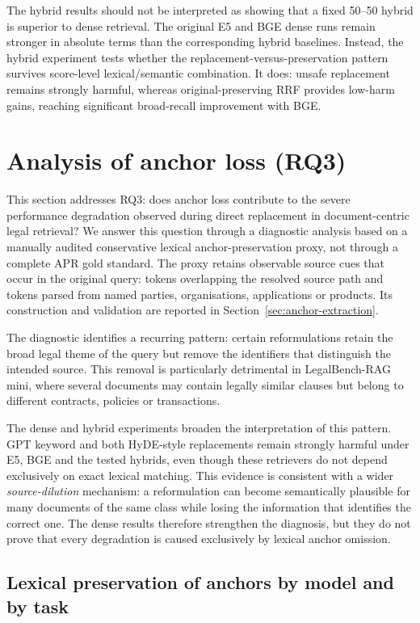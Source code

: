 \documentclass[a4paper,fleqn]{cas-dc}
\begin{document}
The hybrid results should not be interpreted as showing that a
fixed 50--50 hybrid is superior to dense retrieval. The original
E5 and BGE dense runs remain stronger in absolute terms than the
corresponding hybrid baselines. Instead, the hybrid experiment
tests whether the replacement-versus-preservation pattern
survives score-level lexical/semantic combination. It does:
unsafe replacement remains strongly harmful, whereas
original-preserving RRF provides low-harm gains, reaching
significant broad-recall improvement with BGE.

\section{Analysis of anchor loss (RQ3)}
\label{sec:anchor-loss}

This section addresses RQ3: does anchor loss contribute to the
severe performance degradation observed during direct replacement in
document-centric legal retrieval? We answer this question through a
diagnostic analysis based on a manually audited conservative lexical
anchor-preservation proxy, not through a complete APR gold standard.
The proxy retains observable source cues that occur in the original
query: tokens overlapping the resolved source path and tokens parsed
from named parties, organisations, applications or products. Its
construction and validation are reported in
Section~\ref{sec:anchor-extraction}.

The diagnostic identifies a recurring pattern: certain reformulations
retain the broad legal theme of the query but remove the identifiers
that distinguish the intended source. This removal is particularly
detrimental in LegalBench-RAG mini, where several documents may contain
legally similar clauses but belong to different contracts, policies or
transactions.

The dense and hybrid experiments broaden the interpretation of
this pattern. GPT keyword and both HyDE-style replacements remain
strongly harmful under E5, BGE and the tested hybrids, even though
these retrievers do not depend exclusively on exact lexical
matching. This evidence is consistent with a wider
\textit{source-dilution} mechanism: a reformulation can become semantically plausible for many
documents of the same class while losing the information that
identifies the correct one. The dense results therefore strengthen
the diagnosis, but they do not prove that every degradation is
caused exclusively by lexical anchor omission.

\subsection{Lexical preservation of anchors by model
and by task}
\label{sec:apr-by-model}
\end{document}

